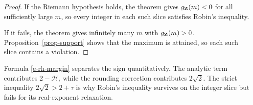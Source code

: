 \begin{proof}
If the Riemann hypothesis holds, the theorem gives
\(g_{\mathbf{Z}}(m)<0\) for all sufficiently large \(m\), so every
integer in each such slice satisfies Robin's inequality.

If it fails, the theorem gives infinitely many \(m\) with
\(g_{\mathbf{Z}}(m)>0\). Proposition~\ref{prop-support} shows that the
maximum is attained, so each such slice contains a violation.
\end{proof}

Formula \eqref{e-rh-margin} separates the sign quantitatively. The
analytic term contributes \(2-\mathcal H\), while the rounding
correction contributes \(2\sqrt2\). The strict inequality
\(2\sqrt2>2+\tau\) is why Robin's inequality survives on the integer
slice but fails for its real-exponent relaxation.
